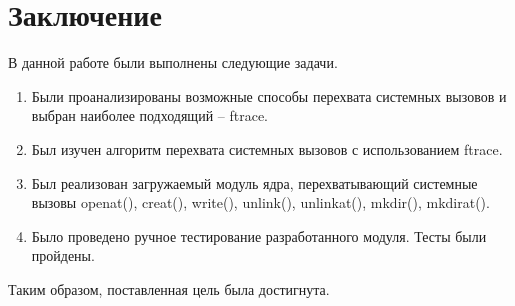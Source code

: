 \documentclass[a4paper,14pt]{article}
\begin{document}
\newpage
\section*{Заключение}

В данной работе были выполнены следующие задачи.

\begin{enumerate}
	\item Были проанализированы возможные способы перехвата системных вызовов и выбран наиболее подходящий -- ftrace.
	\item Был изучен алгоритм перехвата системных вызовов с использованием ftrace.
	\item Был реализован загружаемый модуль ядра, перехватывающий системные вызовы openat(), creat(), write(), unlink(), unlinkat(), mkdir(), mkdirat().
	\item Было проведено ручное тестирование разработанного модуля. Тесты были пройдены.
\end{enumerate}

Таким образом, поставленная цель была достигнута.
\end{document}
